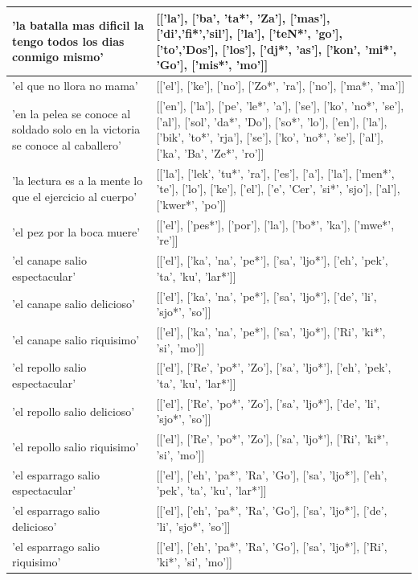 \documentclass[11pt,a4paper,twoside]{tesis}
\begin{document}
\begin{longtable}{| p{} | p{} |}
'la batalla mas dificil la tengo todos los dias conmigo mismo' & [['la'], ['ba', 'ta*', 'Za'], ['mas'], ['di','fi*','sil'], ['la'], ['teN*', 'go'], ['to','Dos'], ['los'], ['dj*', 'as'], ['kon', 'mi*', 'Go'], ['mis*', 'mo']] \\ \hline
'el que no llora no mama' & [['el'], ['ke'], ['no'], ['Zo*', 'ra'], ['no'], ['ma*', 'ma']] \\ \hline
'en la pelea se conoce al soldado solo en la victoria se conoce al caballero' & [['en'], ['la'], ['pe', 'le*', 'a'], ['se'], ['ko', 'no*', 'se'], ['al'], ['sol', 'da*', 'Do'], ['so*', 'lo'], ['en'], ['la'], ['bik', 'to*', 'rja'], ['se'], ['ko', 'no*', 'se'], ['al'], ['ka', 'Ba', 'Ze*', 'ro']] \\ \hline
'la lectura es a la mente lo que el ejercicio al cuerpo' & [['la'], ['lek', 'tu*', 'ra'], ['es'], ['a'], ['la'], ['men*', 'te'], ['lo'], ['ke'], ['el'], ['e', 'Cer', 'si*', 'sjo'], ['al'], ['kwer*', 'po']] \\ \hline
'el pez por la boca muere' & [['el'], ['pes*'], ['por'], ['la'], ['bo*', 'ka'], ['mwe*', 're']] \\ \hline
'el canape salio espectacular' & [['el'], ['ka', 'na', 'pe*'], ['sa', 'ljo*'], ['eh', 'pek', 'ta', 'ku', 'lar*']] \\ \hline
'el canape salio delicioso' & [['el'], ['ka', 'na', 'pe*'], ['sa', 'ljo*'], ['de', 'li', 'sjo*', 'so']] \\ \hline
'el canape salio riquisimo' & [['el'], ['ka', 'na', 'pe*'], ['sa', 'ljo*'], ['Ri', 'ki*', 'si', 'mo']] \\ \hline
'el repollo salio espectacular' & [['el'], ['Re', 'po*', 'Zo'], ['sa', 'ljo*'], ['eh', 'pek', 'ta', 'ku', 'lar*']] \\ \hline
'el repollo salio delicioso' & [['el'], ['Re', 'po*', 'Zo'], ['sa', 'ljo*'], ['de', 'li', 'sjo*', 'so']] \\ \hline
'el repollo salio riquisimo' & [['el'], ['Re', 'po*', 'Zo'], ['sa', 'ljo*'], ['Ri', 'ki*', 'si', 'mo']] \\ \hline
'el esparrago salio espectacular' & [['el'], ['eh', 'pa*', 'Ra', 'Go'], ['sa', 'ljo*'], ['eh', 'pek', 'ta', 'ku', 'lar*']] \\ \hline
'el esparrago salio delicioso' & [['el'], ['eh', 'pa*', 'Ra', 'Go'], ['sa', 'ljo*'], ['de', 'li', 'sjo*', 'so']] \\ \hline
'el esparrago salio riquisimo' & [['el'], ['eh', 'pa*', 'Ra', 'Go'], ['sa', 'ljo*'], ['Ri', 'ki*', 'si', 'mo']] \\ \hline

\end{longtable}
\end{document}
